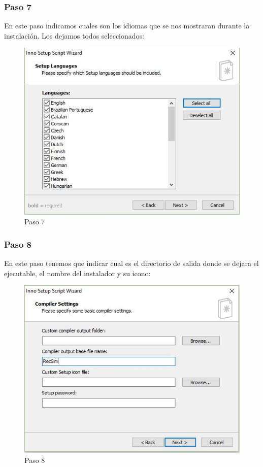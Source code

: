 \newpage

\subsubsection{Paso 7}

En este paso indicamos cuales son los idiomas que se nos mostraran durante la instalación. Los dejamos todos seleccionados:

\begin{figure}[H]
	\centering\includegraphics[scale=0.5]{imagenes/implementacion/7.jpg}
	\caption{Paso 7}
	\label{instaladorPaso7}
\end{figure}

\subsubsection{Paso 8}

En este paso tenemos que indicar cual es el directorio de salida donde se dejara el ejecutable, el nombre del instalador y su icono:

\begin{figure}[H]
	\centering\includegraphics[scale=0.5]{imagenes/implementacion/8.jpg}
	\caption{Paso 8}
	\label{instaladorPaso8}
\end{figure}

